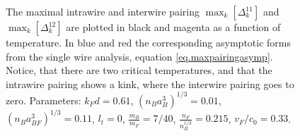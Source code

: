 \begin{figure} 
\begin{center}  
  
\caption{The maximal intrawire and interwire pairing $\max_k[\Delta^{11}_k]$ and $\max_k[\Delta^{12}_k]$ are plotted in black and magenta as a function of temperature. In blue and red the corresponding asymptotic forms from the single wire analysis, equation \eqref{eq.maxpairingasymp}. Notice, that there are two critical temperatures, and that the intrawire pairing shows a kink, where the interwire pairing goes to zero. Parameters: $k_Fd = 0.61$, $(n_Ba_B^3)^{1/3} = 0.01$, $(n_Ba_{BF}^3)^{1/3} = 0.11$, $l_t = 0$, $\frac{m_B}{m_F} = 7/40$, $\frac{n_F}{n_B^{1/3}} = 0.215$, $v_F/c_0 = 0.33$.}  
\label{fig.maximalpairingsTdepend_2wires}  
\end{center}    
\end{figure} 



 



